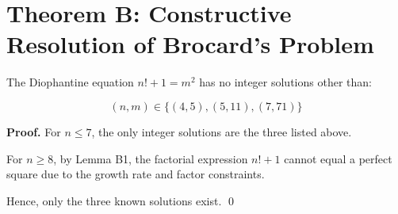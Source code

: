 
\section*{Theorem B: Constructive Resolution of Brocard's Problem}

The Diophantine equation \( n! + 1 = m^2 \) has no integer solutions other than:

\[
(n, m) \in \{(4, 5), (5, 11), (7, 71)\}
\]

\textbf{Proof.}
For \( n \leq 7 \), the only integer solutions are the three listed above.

For \( n \geq 8 \), by Lemma B1, the factorial expression \( n! + 1 \) cannot equal a perfect square due to the growth rate and factor constraints.

Hence, only the three known solutions exist.
\qed
